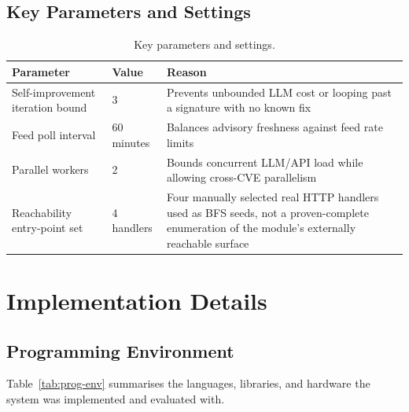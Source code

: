 \documentclass[12pt,a4paper]{report}
\begin{document}
\subsection{Key Parameters and Settings}

\begin{table}[H]
\centering
\caption{Key parameters and settings.}
\begin{tabular}{@{}p{4cm}p{2.5cm}p{6cm}@{}}
\toprule
\textbf{Parameter} & \textbf{Value} & \textbf{Reason} \\
\midrule
Self-improvement iteration bound & 3 & Prevents unbounded LLM cost or looping past a signature with no known fix \\
Feed poll interval & 60 minutes & Balances advisory freshness against feed rate limits \\
Parallel workers & 2 & Bounds concurrent LLM/API load while allowing cross-CVE parallelism \\
Reachability entry-point set & 4 handlers & Four manually selected real HTTP handlers used as BFS seeds, not a proven-complete enumeration of the module's externally reachable surface \\
\bottomrule
\end{tabular}
\end{table}

\section{Implementation Details}

\subsection{Programming Environment}

Table~\ref{tab:prog-env} summarises the languages, libraries, and hardware the system was implemented and evaluated with.
\end{document}
